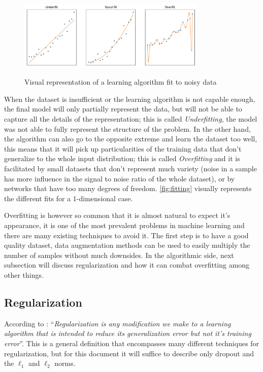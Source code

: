 \begin{figure} [hbt]
    \centering
    \caption{Visual representation of a learning algorithm fit to noisy data}
    \includegraphics[width=0.8\textwidth]{chapters/NeuralNets/figures/fitting.pdf}
    \label{fig:fitting}
\end{figure}
When the dataset is insufficient or the learning algorithm is not capable enough, the final model will only partially represent the data, but will not be able to capture all the details of the representation; this is called \textit{Underfitting}, the model was not able to fully represent the structure of the problem. In the other hand, the algorithm can also go to the opposite extreme and learn the dataset too well, this means that it will pick up particularities of the training data that don't generalize to the whole input distribution; this is called \textit{Overfitting} and it is facilitated by small datasets that don't represent much variety (noise in a sample has more influence in the signal to noise ratio of the whole dataset), or by networks that have too many degrees of freedom. \autoref{fig:fitting} visually represents the different fits for a 1-dimensional case.

Overfitting is however so common that it is almost natural to expect it's appearance, it is one of the most prevalent problems in machine learning and there are many existing techniques to avoid it. The first step is to have a good quality dataset, data augmentation methods can be used to easily multiply the number of samples without much downsides. In the algorithmic side, next subsection will discuss regularization and how it can combat overfitting among other things.

\subsection{Regularization} \label{sub:regularization}
According to \cite[p. 117]{deepLearningBook2016}: ``\textit{Regularization is any modiﬁcation we make to a learning algorithm that is intended to reduce its generalization error but not it's training error}''. This is a general definition that encompasses many different techniques for regularization, but for this document it will suffice to describe only dropout and the $\ell_1$ and $\ell_2$ norms.

